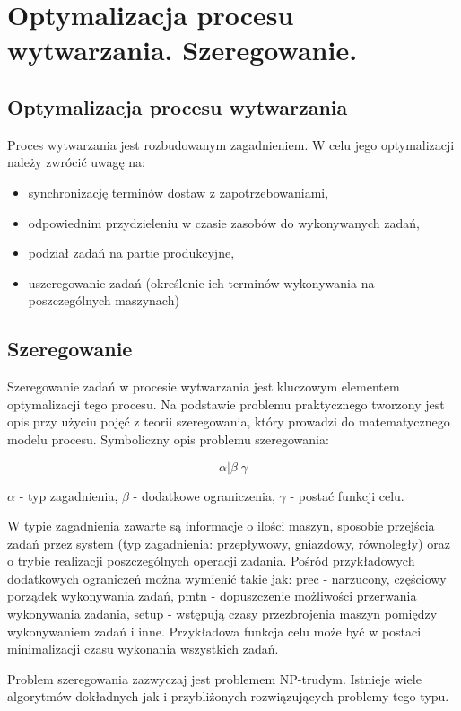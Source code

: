 \section{Optymalizacja procesu wytwarzania. Szeregowanie.}
	\subsection{Optymalizacja procesu wytwarzania}
	
	Proces wytwarzania jest rozbudowanym zagadnieniem. W celu jego optymalizacji należy zwrócić uwagę na:
	\begin{itemize}
		\item synchronizację terminów dostaw z zapotrzebowaniami,
		\item odpowiednim przydzieleniu w czasie zasobów do wykonywanych zadań,
		\item podział zadań na partie produkcyjne,
		\item uszeregowanie zadań (określenie ich terminów wykonywania na poszczególnych maszynach)	
	\end{itemize}		
	
	\subsection{Szeregowanie}
	Szeregowanie zadań w procesie wytwarzania jest kluczowym elementem optymalizacji tego procesu.
	Na podstawie problemu praktycznego tworzony jest opis przy użyciu pojęć z teorii szeregowania, który
	prowadzi do matematycznego modelu procesu. Symboliczny opis problemu szeregowania:
	
	\begin{equation}
		\alpha|\beta|\gamma
	\end{equation}
	
	$\alpha$ - typ zagadnienia, \newline
	$\beta$ - dodatkowe ograniczenia, \newline
	$\gamma$ - postać funkcji celu. \newline
	
	W typie zagadnienia zawarte są informacje o ilości maszyn, sposobie przejścia zadań przez system 
	(typ zagadnienia: przepływowy, gniazdowy, równoległy) oraz o trybie realizacji poszczególnych operacji zadania. \newline
	Pośród przykładowych dodatkowych ograniczeń można wymienić takie jak: prec - narzucony, częściowy porządek 
	wykonywania zadań, pmtn - dopuszczenie możliwości przerwania wykonywania zadania, setup - wstępują czasy 
	przezbrojenia maszyn pomiędzy wykonywaniem zadań i inne.  \newline
	Przykładowa funkcja celu może być w postaci minimalizacji czasu wykonania wszystkich zadań. \newline
	
	Problem szeregowania zazwyczaj jest problemem NP-trudym. Istnieje wiele algorytmów dokładnych jak i przybliżonych
	rozwiązujących problemy tego typu.
	